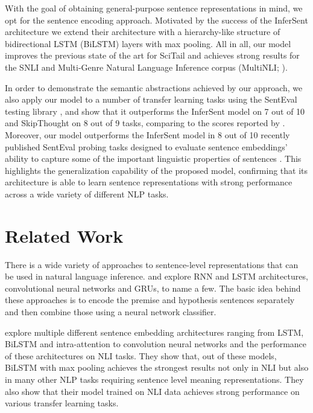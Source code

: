\documentclass{nle}
\begin{document}
With the goal of obtaining general-purpose sentence representations in mind, we opt for the sentence encoding approach. Motivated by the success of the InferSent architecture \citep{infersent} we extend their architecture with a hierarchy-like structure of bidirectional LSTM (BiLSTM) layers with max pooling. All in all, our model improves the previous state of the art for SciTail \citep{scitail} and achieves strong results for the SNLI and Multi-Genre Natural Language Inference corpus (MultiNLI; \citealp{multinli}).

In order to demonstrate the semantic abstractions achieved by our approach, we also apply our model to a number of transfer learning tasks using the SentEval testing library \citep{infersent}, and show that it outperforms the InferSent model on 7 out of 10 and SkipThought \citep{KirosZSZTUF15} on 8 out of 9 tasks, comparing to the scores reported by \cite{infersent}. Moreover, our model outperforms the InferSent model in 8 out of 10 recently published SentEval probing tasks designed to evaluate sentence embeddings' ability to capture some of the important linguistic properties of sentences \citep{probing}.  This highlights the generalization capability of the proposed model, confirming that its architecture is able to learn sentence representations with strong performance across a wide variety of different NLP tasks.


\section{Related Work}
There is a wide variety of approaches to sentence-level representations that can be used in natural language inference. \cite{snli} and \cite{BowmanGRGMP16} explore RNN and LSTM architectures, \cite{MouConv} convolutional neural networks and \cite{VendrovKFU15} GRUs, to name a few. The basic idea behind these approaches is to encode the premise and hypothesis sentences separately and then combine those using a neural network classifier.

\cite{infersent} explore multiple different sentence embedding architectures ranging from LSTM, BiLSTM and intra-attention to convolution neural networks and the performance of these architectures on NLI tasks. They show that, out of these models, BiLSTM with max pooling achieves the strongest results not only in NLI but also in many other NLP tasks requiring sentence level meaning representations. They also show that their model trained on NLI data achieves strong performance on various transfer learning tasks.
\end{document}
